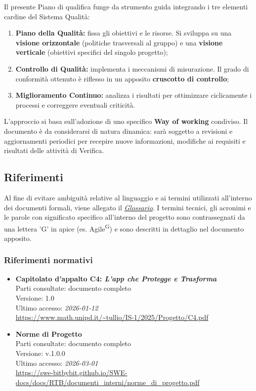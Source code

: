 \documentclass[a4paper,12pt]{article}
\begin{document}
Il presente Piano di qualifica funge da strumento guida integrando i tre elementi cardine del Sistema Qualità:
\begin{enumerate}
    \item \textbf{Piano della Qualità:} fissa gli obiettivi e le risorse. Si sviluppa su una \textbf{visione orizzontale} (politiche trasversali al gruppo) e una \textbf{visione verticale} (obiettivi specifici del singolo progetto);
    \item \textbf{Controllo di Qualità:} implementa i meccanismi di misurazione. Il grado di conformità ottenuto è riflesso in un apposito \textbf{cruscotto di controllo};
    \item \textbf{Miglioramento Continuo:} analizza i risultati per ottimizzare ciclicamente i processi e correggere eventuali criticità.
\end{enumerate}

L'approccio si basa sull'adozione di uno specifico \textbf{Way of working} condiviso. Il documento è da considerarsi di natura dinamica: sarà soggetto a revisioni e aggiornamenti periodici per recepire nuove informazioni, modifiche ai requisiti e risultati delle attività di Verifica.


\subsection{Riferimenti} \label{sec:riferimenti}
Al fine di evitare ambiguità relative al linguaggio e ai termini utilizzati all'interno dei documenti formali, viene allegato il \href{https://swe-bitbybit.github.io/SWE-docs/docs/RTB/documenti_interni/Glossario.pdf}{\textit{Glossario}}.
I termini tecnici, gli acronimi e le parole con significato specifico all'interno del progetto sono contrassegnati da una lettera 'G' in apice (es. Agile\textsuperscript{G}) e sono descritti in dettaglio nel documento apposito.

\subsubsection{Riferimenti normativi}\label{sec:riferimenti_normativi}
\begin{itemize}
\raggedright
\item \textbf{Capitolato d'appalto C4: \emph{L'app che Protegge e Trasforma}}\\
Parti consultate: documento completo\\
Versione: 1.0\\
Ultimo accesso: \textit{2026-01-12}\\
\url{https://www.math.unipd.it/~tullio/IS-1/2025/Progetto/C4.pdf}

\item \textbf{Norme di Progetto}\\
Parti consultate: documento completo\\
Versione: v.1.0.0\\
Ultimo accesso: \textit{2026-03-01}\\
\url{https://swe-bitbybit.github.io/SWE-docs/docs/RTB/documenti_interni/norme_di_progetto.pdf}
\end{itemize}
\end{document}
